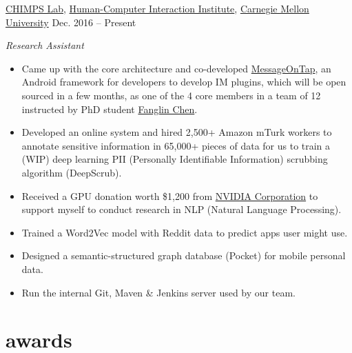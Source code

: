 \documentclass[hidelinks__VERSION__]{adamyi-cv}
\begin{document}
\begin{entrylist}


\entry
{\href{http://cmuchimps.org/}{CHIMPS Lab}, \href{https://www.hcii.cmu.edu/}{Human-Computer Interaction Institute}, \href{https://www.cmu.edu/}{Carnegie Mellon University}}
{Dec. 2016 -- Present}
{\emph{Research Assistant}
\begin{itemize}
\item Came up with the core architecture and co-developed \href{https://github.com/MessageOnTap}{MessageOnTap}, an Android framework for developers to develop IM plugins, which will be open sourced in a few months, as one of the 4 core members in a team of 12 instructed by PhD student \href{mailto:fanglin@cmu.edu}{Fanglin Chen}.
\item Developed an online system and hired 2,500+ Amazon mTurk workers to annotate sensitive information in 65,000+ pieces of data for us to train a (WIP) deep learning PII (Personally Identifiable Information) scrubbing algorithm (DeepScrub).
\item Received a GPU donation worth \$1,200 from \href{https://www.nvidia.com/}{NVIDIA Corporation} to support myself to conduct research in NLP (Natural Language Processing).
\item Trained a Word2Vec model with Reddit data to predict apps user might use.
\item Designed a semantic-structured graph database (Pocket) for mobile personal data.
\item Run the internal Git, Maven \& Jenkins server used by our team.
\end{itemize}}


\end{entrylist}


\section{awards}
\end{document}
